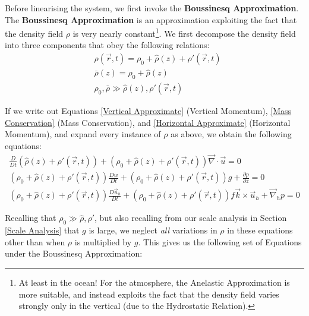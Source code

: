 Before linearising the system, we first invoke the \textbf{Boussinesq Approximation}. The \textbf{Boussinesq Approximation} is an approximation exploiting the fact that the density field \(\rho\) is very nearly constant\footnote{
    At least in the ocean! For the atmosphere, the Anelastic Approximation is more suitable, and instead exploits the fact that the density field varies strongly only in the vertical (due to the Hydrostatic Relation).
}. We first decompose the density field into three components that obey the following relations:
\begin{align*}
    &\rho(\vec{r},t)=\rho_0 + \hat{\rho}(z) + \rho'(\vec{r},t)
    \\
    &\bar{\rho}(z)=\rho_0 + \hat{\rho}(z)
    \\
    &\rho_0,\bar{\rho} \gg \hat{\rho}(z),\rho'(\vec{r},t)
\end{align*}

If we write out Equations \ref{Vertical Approximate} (Vertical Momentum), \ref{Mass Conservation} (Mass Conservation), and \ref{Horizontal Approximate} (Horizontal Momentum), and expand every instance of \(\rho\) as above, we obtain the following equations:
\begin{align*}
    \frac{D}{Dt}\left( \hat{\rho}(z)+\rho'(\vec{r},t) \right)+(\rho_0+\hat{\rho}(z)+\rho'(\vec{r},t))\vec{\nabla}\cdot\vec{u}=0
    \\
    (\rho_0+\hat{\rho}(z)+\rho'(\vec{r},t))\frac{Dw}{Dt}
    +
    (\rho_0+\hat{\rho}(z)+\rho'(\vec{r},t))g + \frac{\partial p}{\partial z}= 0
    \\
    (\rho_0+\hat{\rho}(z)+\rho'(\vec{r},t))\frac{D\vec{u}_h}{Dt}+(\rho_0+\hat{\rho}(z)+\rho'(\vec{r},t))f\vec{k}\times\vec{u}_h + \vec{\nabla}_h p = 0
\end{align*}

Recalling that \(\rho_0 \gg \hat{\rho}, \rho'\), but also recalling from our scale analysis in Section \ref{Scale Analysis} that \(g\) is large, we neglect \textit{all} variations in \(\rho\) in these equations other than when \(\rho\) is multiplied by \(g\). This gives us the following set of Equations under the Boussinesq Approximation:
        
